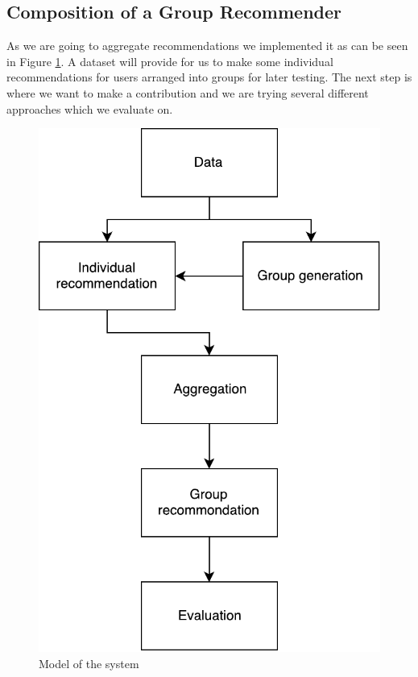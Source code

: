 \subsection{Composition of a Group Recommender}
As we are going to aggregate recommendations we implemented it as can be seen in Figure \ref{fig:composition}. A dataset will provide for us to make some individual recommendations for users arranged into groups for later testing. The next step is where we want to make a contribution and we are trying several different approaches which we evaluate on.
\begin{figure}
\centering
\includegraphics[scale=.4]{graphics/composition}
\caption{Model of the system}\label{fig:composition}
\end{figure}

